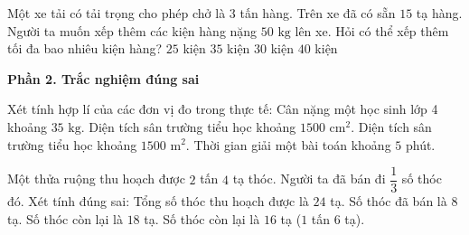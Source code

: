 \begin{ex} %
Một xe tải có tải trọng cho phép chở là $3$ tấn hàng. Trên xe đã có sẵn $15$ tạ hàng. Người ta muốn xếp thêm các kiện hàng nặng $50\text{ kg}$ lên xe. Hỏi có thể xếp thêm tối đa bao nhiêu kiện hàng?
\choice
{$25$ kiện}
{$35$ kiện}
{\True $30$ kiện}
{$40$ kiện}
\end{ex}

\textbf{Phần 2. Trắc nghiệm đúng sai}

\begin{ex} %
Xét tính hợp lí của các đơn vị đo trong thực tế:
\choiceTF
{\True Cân nặng một học sinh lớp 4 khoảng $35\text{ kg}$.}
{Diện tích sân trường tiểu học khoảng $1500\text{ cm}^2$.}
{\True Diện tích sân trường tiểu học khoảng $1500\text{ m}^2$.}
{\True Thời gian giải một bài toán khoảng $5$ phút.}
\end{ex}

\begin{ex} %
Một thửa ruộng thu hoạch được $2$ tấn $4$ tạ thóc. Người ta đã bán đi $\dfrac{1}{3}$ số thóc đó. Xét tính đúng sai:
\choiceTF
{\True Tổng số thóc thu hoạch được là $24$ tạ.}
{\True Số thóc đã bán là $8$ tạ.}
{Số thóc còn lại là $18$ tạ.}
{\True Số thóc còn lại là $16$ tạ ($1$ tấn $6$ tạ).}
\end{ex}

